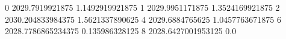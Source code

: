 0 2029.7919921875 1.1492919921875
1 2029.9951171875 1.3524169921875
2 2030.204833984375 1.5621337890625
4 2029.6884765625 1.0457763671875
6 2028.7786865234375 0.135986328125
8 2028.6427001953125 0.0
